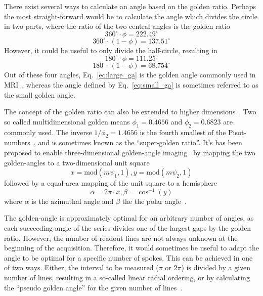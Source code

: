 There exist several ways to calculate an angle based on the golden ratio. Perhaps the most straight-forward would be to calculate the angle which divides the circle in two parts, where the ratio of the two central angles is the golden ratio
\begin{equation}
360^\circ \cdot \phi = 222.49^\circ  
\end{equation}
\begin{equation}
360^\circ \cdot (1 - \phi) = 137.51^\circ  
\label{eq:large_golden}
\end{equation}
However, it could be useful to only divide the half-circle, resulting in
\begin{equation}
\label{eq:large_ga}   
180^\circ \cdot \phi = 111.25^\circ  
\end{equation}
\begin{equation}
\label{eq:small_ga}
180^\circ \cdot (1 - \phi) = 68.754^\circ  
\end{equation}
Out of these four angles, Eq.~\ref{eq:large_ga} is the golden angle commonly used in MRI~\cite{Winkelmann2007}, whereas the angle defined by Eq.~\ref{eq:small_ga} is sometimes referred to as the small golden angle.

The concept of the golden ratio can also be extended to higher dimensions~\cite{Anderson1993}. Two so called multidimensional golden means $\phi_1 = 0.4656$ and $\phi_2 = 0.6823$ are commonly used. The inverse $1/\phi_2 = 1.4656$ is the fourth smallest of the Pisot-numbers~\cite{Berestovskii2007}, and is sometimes known as the ``super-golden ratio''. It's has been proposed to enable three-dimensional golden-angle imaging~\cite{Chan2009, Trotier2015, Holst2017, Schrauben2020} by mapping the two golden-angles to a two-dimensional unit square
\begin{equation}
    x = \textrm{mod}(m\psi_1,1), y = \textrm{mod}(m\psi_2,1)
    \label{eq:double_golden_square}
\end{equation}
followed by a equal-area mapping of the unit square to a hemisphere
\begin{equation}
    \alpha = 2\pi\cdot x, \beta = \cos^{-1}(y)
\end{equation}
where $\alpha$ is the azimuthal angle and $\beta$ the the polar angle~\cite{Chan2009}.


The golden-angle is approximately optimal for an arbitrary number of angles, as each succeeding angle of the series divides one of the largest gaps by the golden ratio. However, the number of readout lines are not always unknown at the beginning of the acquisition. Therefore, it would sometimes be useful to adapt the angle to be optimal for a specific number of spokes. This can be achieved in one of two ways. Either, the interval to be measured ($\pi$ or $2\pi$) is divided by a given number of lines, resulting in a so-called linear radial ordering, or by calculating the ``pseudo golden angle'' for the given number of lines~\cite{Svedin2018}.

